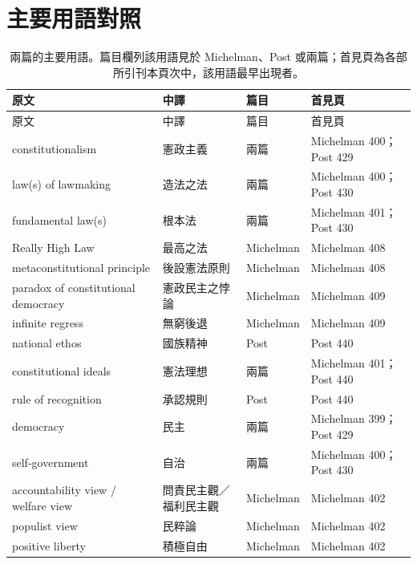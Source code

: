 \chapter{主要用語對照}

\begin{longtable}[]{@{}
  >{\raggedright\arraybackslash}p{}
  >{\raggedright\arraybackslash}p{}
  >{\raggedright\arraybackslash}p{}
  >{\raggedright\arraybackslash}p{}@{}}
\caption{兩篇的主要用語。篇目欄列該用語見於 Michelman、Post 或兩篇；首見頁為各部所引刊本頁次中，該用語最早出現者。}\tabularnewline
\toprule\noalign{}
原文 & 中譯 & 篇目 & 首見頁 \\
\midrule\noalign{}
\endfirsthead
\toprule\noalign{}
原文 & 中譯 & 篇目 & 首見頁 \\
\midrule\noalign{}
\endhead
\bottomrule\noalign{}
\endlastfoot
constitutionalism & 憲政主義 & 兩篇 & Michelman 400；Post 429 \\
law(s) of lawmaking & 造法之法 & 兩篇 & Michelman 400；Post 430 \\
fundamental law(s) & 根本法 & 兩篇 & Michelman 401；Post 430 \\
Really High Law & 最高之法 & Michelman & Michelman 408 \\
metaconstitutional principle & 後設憲法原則 & Michelman & Michelman 408 \\
paradox of constitutional democracy & 憲政民主之悖論 & Michelman & Michelman 409 \\
infinite regress & 無窮後退 & Michelman & Michelman 409 \\
national ethos & 國族精神 & Post & Post 440 \\
constitutional ideals & 憲法理想 & 兩篇 & Michelman 401；Post 440 \\
rule of recognition & 承認規則 & Post & Post 440 \\
democracy & 民主 & 兩篇 & Michelman 399；Post 429 \\
self-government & 自治 & 兩篇 & Michelman 400；Post 430 \\
accountability view / welfare view & 問責民主觀／福利民主觀 & Michelman & Michelman 402 \\
populist view & 民粹論 & Michelman & Michelman 402 \\
positive liberty & 積極自由 & Michelman & Michelman 402 \\

\end{longtable}
